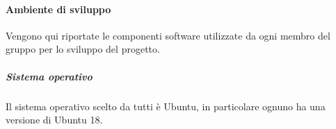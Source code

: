 	    \paragraph{Ambiente di sviluppo}\label{PP:Sviluppo:Strumenti:AmbienteSviluppo}
	    Vengono qui riportate le componenti software utilizzate da ogni membro del gruppo per lo sviluppo del progetto.


	    \subparagraph{Sistema operativo}\label{PP:Sviluppo:Strumenti:AmbienteSviluppo:SistemaOperativo}
	    Il sistema operativo scelto da tutti è Ubuntu, in particolare ognuno ha una versione di Ubuntu 18.


